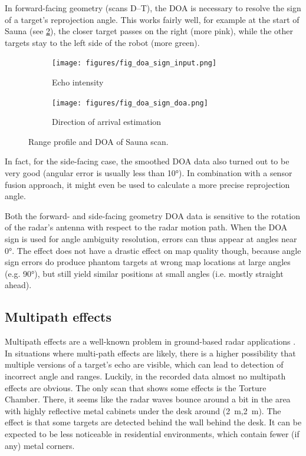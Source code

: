 In forward-facing geometry (scans D--T), the DOA is necessary to resolve
the sign of a target's reprojection angle. This works fairly well, for
example at the start of Sauna (see \cref{fig:sauna_doa}), the closer target
passes on the right (more pink), while the other targets stay to the
left side of the robot (more green).

\begin{figure}[htbp]
    \centering
    \begin{subfigure}[b]{0.45\textwidth}
        \texttt{[image: figures/fig\_doa\_sign\_input.png]}
        \caption{\label{fig:sauna_input}Echo intensity}
    \end{subfigure}%
    \hfill%
    \begin{subfigure}[b]{0.45\textwidth}
        \texttt{[image: figures/fig\_doa\_sign\_doa.png]}
        \caption{\label{fig:sauna_doa}Direction of arrival estimation}
    \end{subfigure}
    \caption{Range profile and DOA of Sauna scan.}
    \label{fig:sauna}
\end{figure}

In fact, for the side-facing case, the smoothed DOA data also turned out
to be very good (angular error is usually less than \ang{10}). In combination with a sensor fusion approach, it might even be used to calculate a more precise
reprojection angle.

Both the forward- and side-facing geometry DOA data is sensitive to the rotation of the radar's antenna with respect to the radar motion path. When the DOA sign is used for angle ambiguity resolution, errors can thus appear at angles near \ang{0}. The effect does not have a drastic effect on map quality though, because angle sign errors do produce phantom targets at wrong map locations at large angles (e.g. \ang{90}), but still yield similar positions at small angles (i.e. mostly straight ahead).

\subsection{Multipath effects}\label{multipath-effects}

Multipath effects are a well-known problem in ground-based radar
applications \cite{Adams2012}. In situations where multi-path effects
are likely, there is a higher possibility that multiple versions of a
target's echo are visible, which can lead to detection of incorrect
angle and ranges. Luckily, in the recorded data almost no multipath
effects are obvious. The only scan that shows some effects is the
Torture Chamber. There, it seems like the radar waves bounce around a
bit in the area with highly reflective metal cabinets under the desk around (\SI{2}{m},\SI{2}{m}). The effect is that some targets are detected behind the wall behind the desk. It can be expected to be less noticeable in residential environments, which contain fewer (if any) metal corners.

